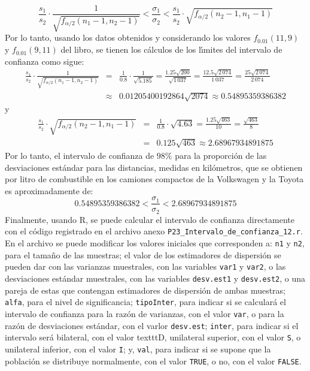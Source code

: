 \begin{solucion}
 \begin{equation*}
  \frac{s_1}{s_2}\cdot \frac{1}{\sqrt{f_{\alpha/2}(n_1-1,n_2-1)}} < \frac{\sigma_1}{\sigma_2} < \frac{s_1}{s_2}\cdot \sqrt{f_{\alpha/2}(n_2-1,n_1-1)}
 \end{equation*}
 Por lo tanto, usando los datos obtenidos y considerando los valores $f_{0.01}(11,9)$ y $f_{0.01}(9,11)$ del libro, se tienen los c\'alculos de los l\'{\i}mites del intervalo de confianza como sigue:
 \begin{eqnarray*}
  \frac{s_1}{s_2}\cdot \frac{1}{\sqrt{f_{\alpha/2}(n_1-1,n_2-1)}} & = & \frac{1}{0.8}\cdot \frac{1}{\sqrt{5.185}} = \frac{1.25\sqrt{200}}{\sqrt{1\,037}} = \frac{12.5\sqrt{2\,074}}{1\,037} = \frac{25\sqrt{2\,074}}{2\,074} \\
  & \approx & 0.01205400192864\sqrt{2074} \approx 0.54895359386382
 \end{eqnarray*}
 y
 \begin{eqnarray*}
  \frac{s_1}{s_2}\cdot \sqrt{f_{\alpha/2}(n_2-1,n_1-1)} & = & \frac{1}{0.8}\cdot \sqrt{4.63} = \frac{1.25\sqrt{463}}{10} = \frac{\sqrt{463}}{8} \\
  & = & 0.125\sqrt{463} \approx 2.68967934891875
 \end{eqnarray*}
 Por lo tanto, el intervalo de confianza de $98\%$ para la proporci\'on de las desviaciones est\'andar para las distancias, medidas en kil\'ometros, que se obtienen por litro de combustible en los camiones compactos de la Volkswagen y la Toyota es aproximadamente de:
 \begin{equation*}
  0.54895359386382 < \frac{\sigma_1}{\sigma_2} < 2.68967934891875
 \end{equation*}
 Finalmente, usando R, se puede calcular el intervalo de confianza directamente con el c\'odigo registrado en el archivo anexo \texttt{P23\_Intervalo\_de\_confianza\_12.r}. En el archivo se puede modificar los valores iniciales que corresponden a: \texttt{n1} y \texttt{n2}, para el tama\~no de las muestras; el valor de los estimadores de dispersi\'on se pueden dar con las varianzas muestrales, con las variables \texttt{var1} y \texttt{var2}, o las desviaciones est\'andar muestrales, con las variables \texttt{desv.est1} y \texttt{desv.est2}, o una pareja de estas que contengan estimadores de dispersi\'on de ambas muestras; \texttt{alfa}, para el nivel de significancia; \texttt{tipoInter}, para indicar si se calcular\'a el intervalo de confianza para la raz\'on de varianzas, con el valor \texttt{var}, o para la raz\'on de desviaciones est\'andar, con el varlor \texttt{desv.est}; \texttt{inter}, para indicar si el intervalo ser\'a bilateral, con el valor texttt{D}, unilateral superior, con el valor \texttt{S}, o unilateral inferior, con el valor \texttt{I}; y, \texttt{val}, para indicar si se supone que la poblaci\'on se distribuye normalmente, con el valor \texttt{TRUE}, o no, con el valor \texttt{FALSE}.

\end{solucion}
